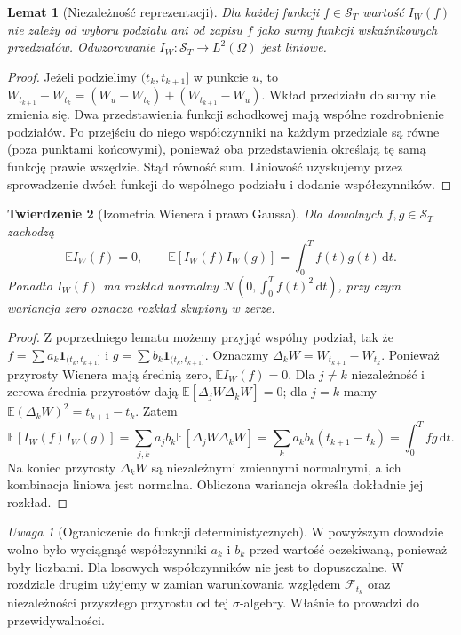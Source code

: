 \documentclass[11pt,a4paper,oneside]{report}
\numberwithin{equation}{chapter}
\theoremstyle{plain}
\newtheorem{twierdzenie}{Twierdzenie}[chapter]
\newtheorem{lemat}[twierdzenie]{Lemat}
\theoremstyle{definition}
\theoremstyle{remark}
\newtheorem{uwaga}{Uwaga}[chapter]
\newcommand{\E}{\mathbb{E}}
\newcommand{\calF}{\mathcal{F}}
\newcommand{\calS}{\mathcal{S}}
\newcommand{\ind}[1]{\mathbf{1}_{#1}}
\newcommand{\dd}{\mathrm{d}}
\newcommand{\Normal}{\mathcal{N}}
\begin{document}
\begin{lemat}[Niezależność reprezentacji]\label{lem:volIII:01:01}
Dla każdej funkcji $f\in\calS_T$ wartość $I_W(f)$
nie zależy od wyboru podziału ani od zapisu $f$ jako sumy
funkcji wskaźnikowych przedziałów. Odwzorowanie
$I_W:\calS_T\to L^2(\Omega)$ jest liniowe.
\end{lemat}
\begin{proof}
Jeżeli podzielimy $(t_k,t_{k+1}]$ w punkcie $u$, to
$W_{t_{k+1}}-W_{t_k}=(W_u-W_{t_k})+(W_{t_{k+1}}-W_u)$.
Wkład przedziału do sumy nie zmienia się. Dwa przedstawienia
funkcji schodkowej mają wspólne rozdrobnienie podziałów.
Po przejściu do niego współczynniki na każdym przedziale są
równe (poza punktami końcowymi), ponieważ oba przedstawienia
określają tę samą funkcję prawie wszędzie. Stąd równość sum.
Liniowość uzyskujemy przez sprowadzenie dwóch funkcji do
wspólnego podziału i dodanie współczynników.
\end{proof}

\begin{twierdzenie}[Izometria Wienera i prawo Gaussa]\label{thm:volIII:01:01}\label{th:wiener-isometry}
Dla dowolnych $f,g\in\calS_T$ zachodzą
\[
\E I_W(f)=0,\qquad
\E[I_W(f)I_W(g)]=\int_0^T f(t)g(t)\,\dd t.
\tag{1.2}\label{eq:wienscalar}
\]
Ponadto $I_W(f)$ ma rozkład normalny
$\Normal(0,\int_0^Tf(t)^2\,\dd t)$,
przy czym wariancja zero oznacza rozkład skupiony w zerze.
\end{twierdzenie}
\begin{proof}
Z poprzedniego lematu możemy przyjąć wspólny podział,
tak że $f=\sum a_k\ind{(t_k,t_{k+1}]}$ i
$g=\sum b_k\ind{(t_k,t_{k+1}]}$. Oznaczmy
$\Delta_kW=W_{t_{k+1}}-W_{t_k}$. Ponieważ przyrosty Wienera
mają średnią zero, $\E I_W(f)=0$. Dla $j\ne k$
niezależność i zerowa średnia przyrostów dają
$\E[\Delta_jW\Delta_kW]=0$; dla $j=k$ mamy
$\E(\Delta_kW)^2=t_{k+1}-t_k$. Zatem
\[
\E[I_W(f)I_W(g)]
=\sum_{j,k}a_jb_k\E[\Delta_jW\Delta_kW]
=\sum_k a_kb_k(t_{k+1}-t_k)
=\int_0^Tfg\,\dd t.
\]
Na koniec przyrosty $\Delta_kW$ są niezależnymi zmiennymi
normalnymi, a ich kombinacja liniowa jest normalna.
Obliczona wariancja określa dokładnie jej rozkład.
\end{proof}

\begin{uwaga}[Ograniczenie do funkcji deterministycznych]
W powyższym dowodzie wolno było wyciągnąć współczynniki
$a_k$ i $b_k$ przed wartość oczekiwaną, ponieważ były liczbami.
Dla losowych współczynników nie jest to dopuszczalne.
W rozdziale drugim użyjemy w zamian warunkowania względem
$\calF_{t_k}$ oraz niezależności przyszłego przyrostu od tej
$\sigma$-algebry. Właśnie to prowadzi do przewidywalności.
\end{uwaga}
\end{document}
